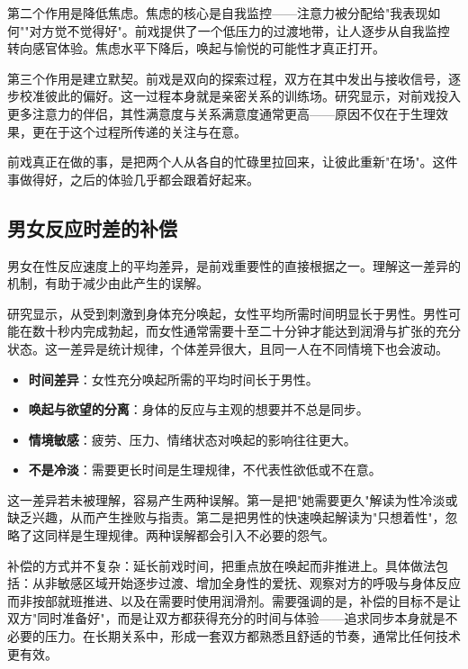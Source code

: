 \documentclass[12pt,UTF8]{ctexbook}
\newcommand{\keyword}[1]{\textbf{#1}}
\begin{document}
第二个作用是降低焦虑。焦虑的核心是自我监控——注意力被分配给"我表现如何""对方觉不觉得好"。前戏提供了一个低压力的过渡地带，让人逐步从自我监控转向感官体验。焦虑水平下降后，唤起与愉悦的可能性才真正打开。

第三个作用是建立默契。前戏是双向的探索过程，双方在其中发出与接收信号，逐步校准彼此的偏好。这一过程本身就是亲密关系的训练场。研究显示，对前戏投入更多注意力的伴侣，其性满意度与关系满意度通常更高——原因不仅在于生理效果，更在于这个过程所传递的关注与在意。

\begin{tcolorbox}[colback=pink!5!white,colframe=red!50!black,title=贴心小叮咛]
前戏真正在做的事，是把两个人从各自的忙碌里拉回来，让彼此重新"在场"。这件事做得好，之后的体验几乎都会跟着好起来。
\end{tcolorbox}
\subsection{男女反应时差的补偿}

男女在性反应速度上的平均差异，是前戏重要性的直接根据之一。理解这一差异的机制，有助于减少由此产生的误解。

研究显示，从受到刺激到身体充分唤起，女性平均所需时间明显长于男性。男性可能在数十秒内完成勃起，而女性通常需要十至二十分钟才能达到润滑与扩张的充分状态。这一差异是统计规律，个体差异很大，且同一人在不同情境下也会波动。

\begin{itemize}
  \item \keyword{时间差异}：女性充分唤起所需的平均时间长于男性。
  \item \keyword{唤起与欲望的分离}：身体的反应与主观的想要并不总是同步。
  \item \keyword{情境敏感}：疲劳、压力、情绪状态对唤起的影响往往更大。
  \item \keyword{不是冷淡}：需要更长时间是生理规律，不代表性欲低或不在意。
\end{itemize}

这一差异若未被理解，容易产生两种误解。第一是把"她需要更久"解读为性冷淡或缺乏兴趣，从而产生挫败与指责。第二是把男性的快速唤起解读为"只想着性"，忽略了这同样是生理规律。两种误解都会引入不必要的怨气。

补偿的方式并不复杂：延长前戏时间，把重点放在唤起而非推进上。具体做法包括：从非敏感区域开始逐步过渡、增加全身性的爱抚、观察对方的呼吸与身体反应而非按部就班推进、以及在需要时使用润滑剂。需要强调的是，补偿的目标不是让双方"同时准备好"，而是让双方都获得充分的时间与体验——追求同步本身就是不必要的压力。在长期关系中，形成一套双方都熟悉且舒适的节奏，通常比任何技术更有效。
\end{document}

